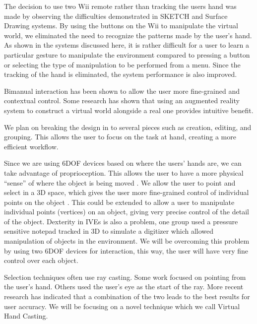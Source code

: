 The decision to use two Wii remote rather than tracking the users hand was made by observing the difficulties demonstrated in SKETCH\cite{SKETCH} and Surface Drawing \cite{Drawing} systems. By using the buttons on the Wii to manipulate the virtual world, we eliminated the need to recognize the patterns made by the user’s hand. As shown in the systems discussed here, it is rather difficult for a user to learn a particular gesture to manipulate the environment compared to pressing a button or selecting the type of manipulation to be performed from a menu. Since the tracking of the hand is eliminated, the system performance is also improved.

Bimanual interaction has been shown to allow the user more fine-grained and contextual control\cite{Zeleznik:1997:TPI:253284.253316}.
Some research has shown that using an augmented reality system to construct a virtual world alongside a real one provides intuitive benefit\cite{Jota:2011:CVM:1979742.1979915}.

We plan on breaking the design in to several pieces such as creation, editing, and grouping. This allows the user to focus on the task at hand, creating a more efficient workflow\cite{Butterworth:1992:3DM}.

Since we are using 6DOF devices based on where the users' hands are, we can take advantage of proprioception.
This allows the user to have a more physical ``sense'' of where the object is being moved \cite{Mine:MovingObjects}.
We allow the user to point and select in a 3D space, which gives the user more fine-grained control of individual points on the object \cite{5759472}.
This could be extended to allow a user to manipulate individual points (vertices) on an object, giving very precise control of the detail of the object.
Dexterity in IVEs is also a problem, one group used a pressure sensitive notepad tracked in 3D to simulate a digitizer which allowed manipulation of objects in the environment\cite{658467}.
We will be overcoming this problem by using two 6DOF devices for interaction, this way, the user will have very fine control over each object.

Selection techniques often use ray casting.
Some work focused on pointing from the user's hand\cite{Mine:MovingObjects}.
Others used the user's eye as the start of the ray\cite{Pierce:1997:IPI:253284.253303}.
More recent research has indicated that a combination of the two leads to the best results for user accuracy\cite{5307641}.
We will be focusing on a novel technique which we call Virtual Hand Casting.

